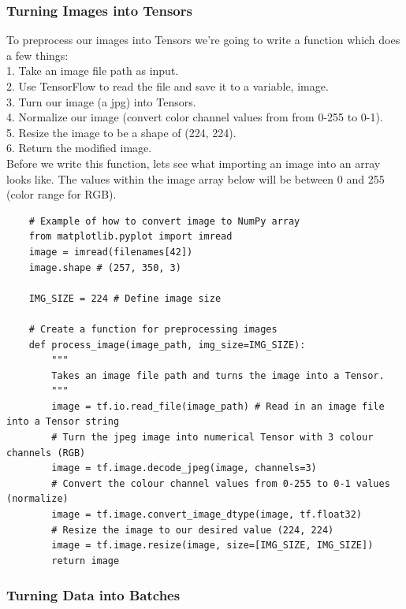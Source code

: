 \documentclass[11pt, a4paper]{article}
\begin{document}
\begin{spacing}{1.1}
	\subsubsection{Turning Images into Tensors}
	To preprocess our images into Tensors we're going to write a function which does a few things: \vspace*{1mm} \\
	\hspace*{2mm} 1. Take an image file path as input. \\
	\hspace*{2mm} 2. Use TensorFlow to read the file and save it to a variable, image. \\
	\hspace*{2mm} 3. Turn our image (a jpg) into Tensors. \\
	\hspace*{2mm} 4. Normalize our image (convert color channel values from from 0-255 to 0-1). \\
	\hspace*{2mm} 5. Resize the image to be a shape of (224, 224). \\
	\hspace*{2mm} 6. Return the modified image. \vspace*{1mm} \\
	Before we write this function, lets see what importing an image into an array looks like. The values within the image array below will be between 0 and 255 (color range for RGB). 
	\begin{lstlisting}
	# Example of how to convert image to NumPy array
	from matplotlib.pyplot import imread
	image = imread(filenames[42])
	image.shape # (257, 350, 3)
	
	IMG_SIZE = 224 # Define image size
	
	# Create a function for preprocessing images
	def process_image(image_path, img_size=IMG_SIZE):
		"""
		Takes an image file path and turns the image into a Tensor.
		"""
		image = tf.io.read_file(image_path) # Read in an image file into a Tensor string
		# Turn the jpeg image into numerical Tensor with 3 colour channels (RGB)
		image = tf.image.decode_jpeg(image, channels=3)
		# Convert the colour channel values from 0-255 to 0-1 values (normalize)
		image = tf.image.convert_image_dtype(image, tf.float32)
		# Resize the image to our desired value (224, 224)
		image = tf.image.resize(image, size=[IMG_SIZE, IMG_SIZE])
		return image \end{lstlisting} \vspace*{1mm}
	\subsubsection{Turning Data into Batches}
	
	
	
	
	
	
	
	
	
	
	
	
	
	
	
	
	
	
	
		
	\end{spacing}
\end{document}
